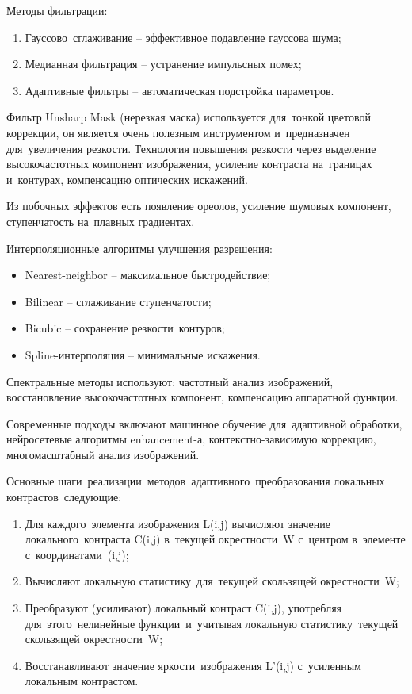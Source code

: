 \documentclass{ou}
\begin{document}
Методы фильтрации:
\begin{enumerate}[itemindent=2em, nosep, label=\arabic*)]
\item Гауссово~сглаживание -- эффективное подавление гауссова шума;
\item Медианная фильтрация -- устранение импульсных помех;
\item Адаптивные фильтры -- автоматическая подстройка параметров.
\end{enumerate}

Фильтр Unsharp Mask (нерезкая маска) используется для~тонкой цветовой коррекции, он является очень полезным инструментом и~предназначен для~увеличения резкости. Технология повышения резкости через выделение высокочастотных компонент изображения, усиление контраста на~границах и~контурах, компенсацию оптических искажений.

Из побочных эффектов есть появление ореолов, усиление шумовых компонент, ступенчатость на~плавных градиентах.

Интерполяционные алгоритмы улучшения разрешения:
\begin{itemize}[label=-, itemindent=2em, nosep]
\item Nearest-neighbor -- максимальное быстродействие;
\item Bilinear -- сглаживание ступенчатости;
\item Bicubic -- сохранение резкости~контуров;
\item Spline-интерполяция -- минимальные искажения.
\end{itemize}

Спектральные методы используют: частотный анализ изображений, восстановление высокочастотных компонент, компенсацию аппаратной функции.

Современные подходы включают машинное обучение для~адаптивной обработки, нейросетевые алгоритмы enhancement-а, контекстно-зависимую коррекцию, многомасштабный анализ изображений.

Основные шаги~реализации~методов~адаптивного~преобразования локальных контрастов~следующие:
\begin{enumerate}[itemindent=2em, nosep, label=\arabic*)]
\item Для каждого~элемента изображения L(i,j) вычисляют значение локального~контраста C(i,j) в~текущей окрестности~W с~центром в~элементе с~координатами~(i,j);
\item Вычисляют локальную статистику~для~текущей скользящей окрестности~W;
\item Преобразуют (усиливают) локальный контраст C(i,j), употребляя для~этого~нелинейные функции~и~учитывая локальную статистику~текущей скользящей окрестности~W;
\item Восстанавливают значение яркости~изображения L'(i,j) с~усиленным локальным контрастом.
\end{enumerate}
\newpage
\end{document}
